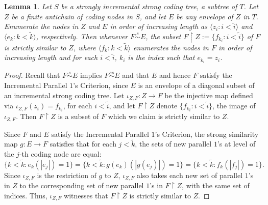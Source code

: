 \documentclass{amsart}
\newtheorem{lem}[thm]{Lemma}
\theoremstyle{remark}
\theoremstyle{definition}
\theoremstyle{remark}
\newcommand{\sse}{\subseteq}
\newcommand{\re}{\restriction}
\newcommand{\ssim}{\stackrel{s}{\sim}}
\newcommand{\sssim}{\stackrel{ss}{\sim}}
\newcommand{\ra}{\rightarrow}
\newcommand{\lgl}{\langle}
\newcommand{\rgl}{\rangle}
\newcommand{\IPOC}{Incremental Parallel $1$'s Criterion}
\begin{document}
\begin{lem}\label{lem.lastpiece}
Let
$S$ be a strongly incremental strong coding tree, a subtree of $T$.
Let $Z$ be a finite antichain  of coding nodes in  $S$, and let $E$ be any envelope of $Z$ in $T$.
Enumerate the nodes
in $Z$ and $E$ in
order of increasing length as
$\lgl z_i:i<\tilde{i}\rgl$ and
 $\lgl e_k:k<\tilde{k}\rgl$,
respectively.
Then whenever  $F\ssim E$, the subset
$F\re Z:=\{f_{k_i}:i<\tilde{i}\}$ of $F$
is strictly similar to $Z$, where
$\lgl f_k:k<\tilde{k}\rgl$
enumerates the nodes in $F$ in order of increasing length
 and for each $i<\tilde{i}$,
$k_i$ is the index such that $e_{k_i}=z_i$.
\end{lem}



\begin{proof}
Recall that $F\ssim E$ implies $F\sssim E$ and that $E$ and hence $F$ satisfy the \IPOC,
since  $E$ is an envelope of  a diagonal subset of an incremental strong coding tree.
Let   $\iota_{Z,F}:Z\ra F$ be the injective map defined via $\iota_{Z,F}(z_i)=f_{k_i}$, for each $i<\tilde{i}$,
and let
 $F\re Z$ denote  $\{f_{k_i}:i<\tilde{i}\}$, the image of $\iota_{Z,F}$.
Then $F\re Z$ is a subset of $F$ which we claim is strictly similar to $Z$.


Since $F$ and $E$ satisfy the \IPOC,
 the strong similarity map $g:E\ra F$
satisfies that for each $j<\tilde{k}$, the sets of new parallel $1$'s at level of the $j$-th coding node are equal:
\begin{equation}
\{k<\tilde{k}:e_k(|e_j|)=1\}=
\{k<\tilde{k}: g(e_k)(|g(e_j)|)=1\}
=\{k<\tilde{k}:f_k(|f_j|)=1\}.
\end{equation}
Since $\iota_{Z,F}$ is the restriction of $g$ to $Z$,
$\iota_{Z,F}$ also
takes each
  new set of parallel $1$'s  in $Z$
 to the corresponding set of new parallel $1$'s in  $F\re Z$, with the same set of indices.
Thus, $\iota_{Z,F}$ witnesses that $F\re Z$ is
strictly similar to  $Z$.
\end{proof}






\end{document}
